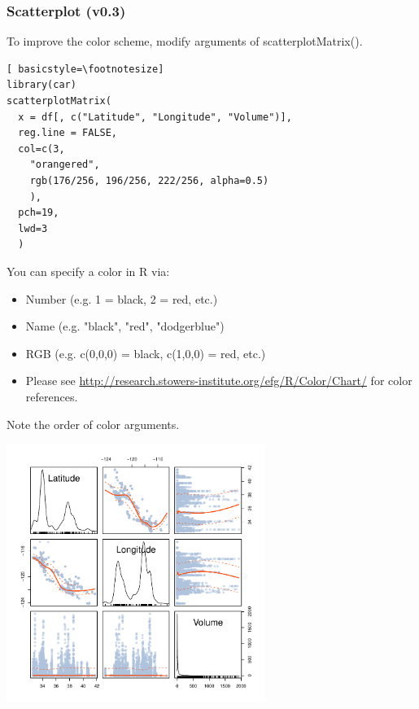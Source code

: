 \begin{frame}
\frametitle{Scatterplot (v0.3)}

To improve the color scheme, modify arguments of \ttfamily scatterplotMatrix().  
  		\begin{lstlisting}[ basicstyle=\footnotesize]
library(car)		
scatterplotMatrix(
  x = df[, c("Latitude", "Longitude", "Volume")], 
  reg.line = FALSE,
  col=c(3,
    "orangered",
    rgb(176/256, 196/256, 222/256, alpha=0.5)
    ), 
  pch=19,
  lwd=3
  )
		\end{lstlisting}
\normalfont
\framebreak
You can specify a color in R via: 
\begin{itemize}
	\item Number (e.g. 1 = black, 2 = red, etc.)
	\item Name (e.g. "black", "red", "dodgerblue")
	\item RGB (e.g. c(0,0,0) = black, c(1,0,0) = red, etc.)
	\item Please see \url{http://research.stowers-institute.org/efg/R/Color/Chart/} for color references. 
\end{itemize}

\noindent Note the order of color arguments. \normalfont
        \begin{center}
         \includegraphics[width=0.63\textwidth]{images/scatterPlot_v3.pdf}
        \end{center}
\end{frame}



